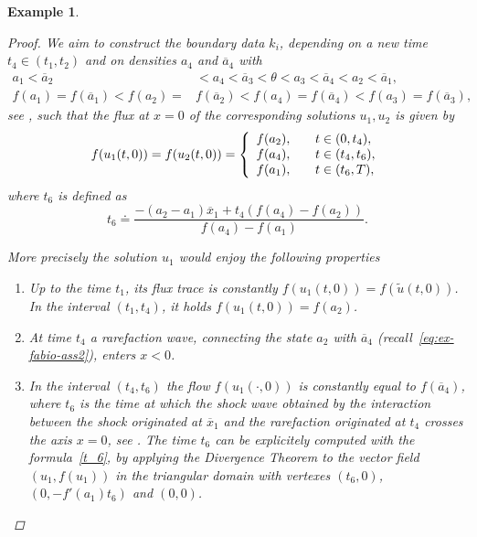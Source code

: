 \documentclass[a4paper, 10pt, final]{article}
\newtheorem{example}{Example}[section]
\begin{document}
\begin{example}
\begin{proof}
    We aim to construct  the boundary data $k_i$, depending on   a new time  $t_4\in (t_1, t_2)$ 
    and on densities $a_4$ and $\overline{a}_4$  with
    \begin{equation}
      \label{eq:ex-fabio-ass2}
      \begin{split}
        a_1< \overline a_2 & <a_4<\overline a_3<\theta<a_3<\overline a_4<a_2 < \overline a_1,  \\  
        f(a_1) = f(\overline a_1) <f(a_2)=&f(\overline a_2)<f(a_4)=f(\overline a_4)<f(a_3)=f(\overline a_3),
      \end{split}
    \end{equation}   
    see ,  such that the flux at $x=0$ of the corresponding solutions $u_1,u_2$ is given by
    \begin{equation*}
      \label{eq:boundary-ex-fabio}
      f(u_1(t,0)) = f(u_2(t,0))=\left\{
        \begin{array}{l@{\qquad}l}
          f(a_2),
          & t \in (0, t_4),
          \\
          f(a_4),
          & t \in (t_4, t_6),
          \\
        f(a_1),
          & t \in (t_6, T),
        \end{array}
      \right.
    \end{equation*} 
    where $t_6$ is defined as 
    \begin{equation}
      \label{t_6}
      t_6  \doteq \displaystyle \frac{-(a_2 - a_1)\overline{x}_1 + t_4 (f(a_4) - f(a_2))}{f(a_4) - f(a_1)}.
    \end{equation} 
    
    More precisely the solution $u_1$ would enjoy the following properties
    \begin{enumerate}
    \item[1.1] Up to the time $t_1$, its flux trace is constantly $f(u_1(t,0))=f(\widetilde u(t,0))$. 
      In the interval $(t_1, t_4)$, it holds $f(u_1(t,0)) = f(a_2)$.
    \item[1.2] At time $t_4$  a rarefaction wave, connecting the state $a_2$ with $\overline a_4$ 
      (recall~\eqref{eq:ex-fabio-ass2}), enters $x<0$.
    \item[1.3] In the interval $(t_4, t_6)$ the flow $f(u_1(\cdot,0))$ is constantly equal to $f(\overline a_4)$,  
      where $t_6$ is the time at which the shock wave obtained by the interaction between the shock originated 
      at $\overline x_1$ and the rarefaction originated at $t_4$ crosses the axis $x=0$, 
      see . The time $t_6$ can be explicitely computed with the formula~\eqref{t_6},
      by applying the Divergence Theorem to the vector field $(u_1, f(u_1))$ 
      in the triangular domain with vertexes $(t_6,0)$, $(0, -f'(a_1)t_6)$ and $(0,0)$.


\end{enumerate}
\end{proof}
\end{example}
\end{document}
